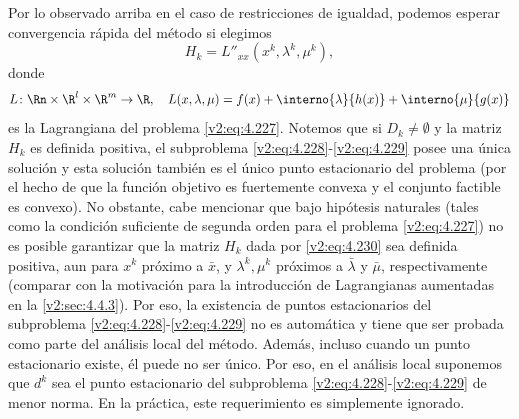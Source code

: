 Por lo observado arriba en el caso de restricciones de igualdad, podemos esperar convergencia rápida del método si elegimos
\begin{equation}
H_k = L''_{xx}(x^k, \lambda^k, \mu^k),
\label{v2:eq:4.230}
\end{equation}
donde
\[
L \colon \Rn \times \R^l \times \R^m \to \R, \quad L(x, \lambda, \mu) = f(x) + \interno{\lambda}{h(x)} + \interno{\mu}{g(x)}
\]
es la Lagrangiana del problema \eqref{v2:eq:4.227}. Notemos que si $D_k \neq \emptyset$ y la matriz $H_k$ es definida positiva, el subproblema \eqref{v2:eq:4.228}-\eqref{v2:eq:4.229} posee una única solución y esta solución también es el único punto estacionario del problema (por el hecho de que la función objetivo es fuertemente convexa y el conjunto factible es convexo). No obstante, cabe mencionar que bajo hipótesis naturales (tales como la condición suficiente de segunda orden para el problema \eqref{v2:eq:4.227}) no es posible garantizar que la matriz $H_k$ dada por \eqref{v2:eq:4.230} sea definida positiva, aun para $x^k$ próximo a $\bar{x}$, y $\lambda^k, \mu^k$ próximos a $\bar{\lambda}$ y $\bar{\mu}$, respectivamente (comparar con la motivación para la introducción de Lagrangianas aumentadas en la \cref{v2:sec:4.4.3}). Por eso, la existencia de puntos estacionarios del subproblema \eqref{v2:eq:4.228}-\eqref{v2:eq:4.229} no es automática y tiene que ser probada como parte del análisis local del método. Además, incluso cuando un punto estacionario existe, él puede no ser único. Por eso, en el análisis local suponemos que $d^k$ sea el punto estacionario del subproblema \eqref{v2:eq:4.228}-\eqref{v2:eq:4.229} de menor norma. En la práctica, este requerimiento es simplemente ignorado.

